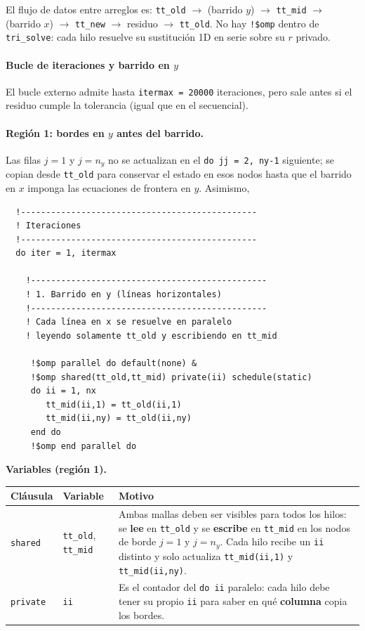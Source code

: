\documentclass[11pt,a4paper]{article}
\begin{document}
El flujo de datos entre arreglos es:
\texttt{tt\_old} $\rightarrow$ (barrido $y$) $\rightarrow$ \texttt{tt\_mid}
$\rightarrow$ (barrido $x$) $\rightarrow$ \texttt{tt\_new} $\rightarrow$
residuo $\rightarrow$ \texttt{tt\_old}. No hay \texttt{!\$omp} dentro de
\texttt{tri\_solve}: cada hilo resuelve su sustituci\'on 1D en serie sobre su $r$
privado.

\paragraph{Bucle de iteraciones y barrido en $y$}

El bucle externo admite hasta \texttt{itermax = 20000} iteraciones, pero sale antes si
el residuo cumple la tolerancia (igual que en el secuencial).

\paragraph{Regi\'on 1: bordes en $y$ antes del barrido.}
Las filas $j=1$ y $j=n_y$ no se actualizan en el \texttt{do jj = 2, ny-1}
siguiente; se copian desde \texttt{tt\_old} para conservar el estado en esos
nodos hasta que el barrido en $x$ imponga las ecuaciones de frontera en $y$. Asimismo,

\begin{verbatim}
  !-----------------------------------------------
  ! Iteraciones
  !-----------------------------------------------  
  do iter = 1, itermax

    !-----------------------------------------------   
    ! 1. Barrido en y (líneas horizontales)
    !-----------------------------------------------
    ! Cada línea en x se resuelve en paralelo
    ! leyendo solamente tt_old y escribiendo en tt_mid

     !$omp parallel do default(none) &
     !$omp shared(tt_old,tt_mid) private(ii) schedule(static)
     do ii = 1, nx
        tt_mid(ii,1) = tt_old(ii,1)
        tt_mid(ii,ny) = tt_old(ii,ny)
     end do
     !$omp end parallel do
\end{verbatim}

\noindent\textbf{Variables (regi\'on 1).}
\begin{center}
\footnotesize
\begin{tabular}{@{}llM{7.6cm}@{}}
\hline
Cl\'ausula & Variable & Motivo \\
\hline
\texttt{shared} & \texttt{tt\_old}, \texttt{tt\_mid} &
Ambas mallas deben ser visibles para todos los hilos: se \textbf{lee} en
\texttt{tt\_old} y se \textbf{escribe} en \texttt{tt\_mid} en los nodos de borde
$j=1$ y $j=n_y$. Cada hilo recibe un \texttt{ii} distinto y solo actualiza
\texttt{tt\_mid(ii,1)} y \texttt{tt\_mid(ii,ny)}. \\
\texttt{private} & \texttt{ii} &
Es el contador del \texttt{do ii} paralelo: cada hilo debe tener su propio
\texttt{ii} para saber en qu\'e \textbf{columna} copia los bordes. \\
\hline
\end{tabular}
\end{center}
\end{document}
